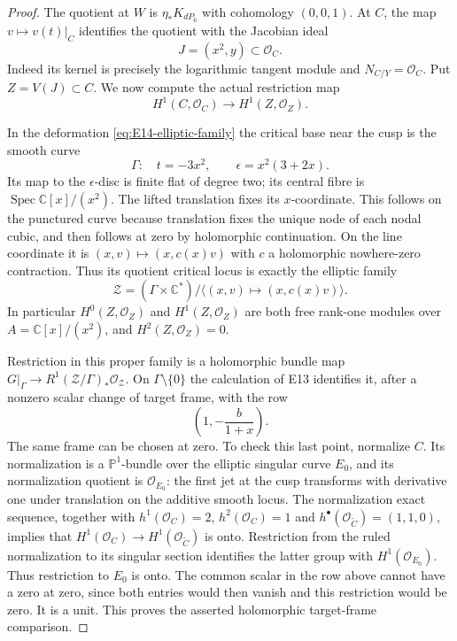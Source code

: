 \begin{proof}
The quotient at $W$ is $\eta_*K_{dP_6}$ with cohomology $(0,0,1)$.
At $C$, the map $v\mapsto v(t)|_C$ identifies the quotient with
the Jacobian ideal
\[
 J=(x^2,y)\subset\mathcal O_C.
\]
Indeed its kernel is precisely the logarithmic tangent module and
$N_{C/Y}=\mathcal O_C$. Put $Z=V(J)\subset C$. We now compute
the actual restriction map
\begin{equation}\label{eq:E14-jet-map}
 H^1(C,\mathcal O_C)\longrightarrow H^1(Z,\mathcal O_Z).
\end{equation}

In the deformation \eqref{eq:E14-elliptic-family} the critical
base near the cusp is the smooth curve
\[
 \Gamma:\quad t=-3x^2,\qquad
 \epsilon=x^2(3+2x).
\]
Its map to the $\epsilon$-disc is finite flat of degree two; its
central fibre is $\operatorname{Spec}\mathbb C[x]/(x^2)$.
The lifted translation fixes its $x$-coordinate. This follows on
the punctured curve because translation fixes the unique node of
each nodal cubic, and then follows at zero by holomorphic
continuation. On the line coordinate it is
$(x,v)\mapsto(x,c(x)v)$ with $c$ a holomorphic nowhere-zero
contraction. Thus its quotient critical locus is exactly the
elliptic family
\[
 \mathcal Z=(\Gamma\times\mathbb C^*)/
       \langle(x,v)\mapsto(x,c(x)v)\rangle.
\]
In particular $H^0(Z,\mathcal O_Z)$ and
$H^1(Z,\mathcal O_Z)$ are both free rank-one modules over
$A=\mathbb C[x]/(x^2)$, and $H^2(Z,\mathcal O_Z)=0$.

Restriction in this proper family is a holomorphic bundle map
$G|_\Gamma\to R^1(\mathcal Z/\Gamma)_*\mathcal O_{\mathcal Z}$.
On $\Gamma\setminus\{0\}$ the calculation of E13 identifies it,
after a nonzero scalar change of target frame, with the row
\[
 \left(1,-\frac{b}{1+x}\right).
\]
The same frame can be chosen at zero. To check this last point,
normalize $C$. Its normalization is a $\mathbb P^1$-bundle over
the elliptic singular curve $E_0$, and its normalization quotient
is $\mathcal O_{E_0}$: the first jet at the cusp transforms with
derivative one under translation on the additive smooth locus.
The normalization exact sequence, together with
$h^1(\mathcal O_C)=2$, $h^2(\mathcal O_C)=1$ and
$h^\bullet(\mathcal O_{\widetilde C})=(1,1,0)$, implies
that $H^1(\mathcal O_C)\to H^1(\mathcal O_{\widetilde C})$
is onto. Restriction from the ruled normalization to its singular
section identifies the latter group with $H^1(\mathcal O_{E_0})$.
Thus restriction to $E_0$ is onto. The common scalar in the row
above cannot have a zero at zero, since both entries would then
vanish and this restriction would be zero. It is a unit. This
proves the asserted holomorphic target-frame comparison.


\end{proof}
